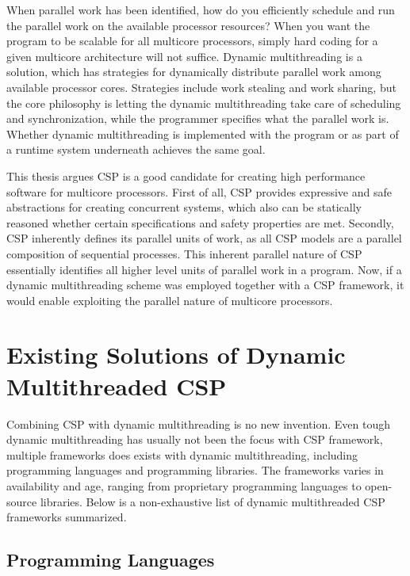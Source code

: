 When parallel work has been identified, how do you efficiently schedule and run the parallel work on the available processor resources? When you want the program to be scalable for all multicore processors, simply hard coding for a given multicore architecture will not suffice. Dynamic multithreading is a solution, which has strategies for dynamically distribute parallel work among available processor cores. Strategies include work stealing and work sharing, but the core philosophy is letting the dynamic multithreading take care of scheduling and synchronization, while the programmer specifies what the parallel work is. Whether dynamic multithreading is implemented with the program or as part of a runtime system underneath achieves the same goal. 

This thesis argues CSP is a good candidate for creating high performance software for multicore processors. First of all, CSP provides expressive and safe abstractions for creating concurrent systems, which also can be statically reasoned whether certain specifications and safety properties are met. Secondly, CSP inherently defines its parallel units of work, as all CSP models are a parallel composition of sequential processes. This inherent parallel nature of CSP essentially identifies all higher level units of parallel work in a program. Now, if a dynamic multithreading scheme was employed together with a CSP framework, it would enable exploiting the parallel nature of multicore processors.


\section{Existing Solutions of Dynamic Multithreaded CSP}
\label{sec:multicore_csp_existing}


Combining CSP with dynamic multithreading is no new invention. Even tough dynamic multithreading has usually not been the focus with CSP framework, multiple frameworks does exists with dynamic multithreading, including programming languages and programming libraries. The frameworks varies in availability and age, ranging from proprietary programming languages to open\hyp{}source libraries. Below is a non\hyp{}exhaustive list of dynamic multithreaded CSP frameworks summarized.


\subsection{Programming Languages}


